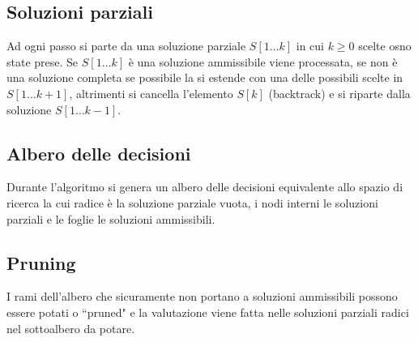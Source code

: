 \subsection{Soluzioni parziali}
Ad ogni passo si parte da una soluzione parziale $S[1\dots k]$ in cui $k\ge 0$ scelte osno state prese. Se $S[1\dots k]$ \`e una soluzione ammissibile viene processata, se non \`e 
una soluzione completa se possibile la si estende con una delle possibili scelte in $S[1\dots k+1]$, altrimenti si cancella l'elemento $S[k]$ (backtrack) e si riparte dalla soluzione
$S[1\dots k-1]$.
\subsection{Albero delle decisioni}
Durante l'algoritmo si genera un albero delle decisioni equivalente allo spazio di ricerca la cui radice \`e la soluzione parziale vuota, i nodi interni le soluzioni parziali e le
foglie le soluzioni ammissibili.
\subsection{Pruning}
I rami dell'albero che sicuramente non portano a soluzioni ammissibili possono essere potati o ``pruned" e la valutazione viene fatta nelle soluzioni parziali radici nel sottoalbero da
potare.
